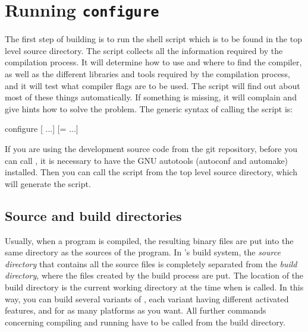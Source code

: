 \section{Running \texttt{configure}}
\label{sec:configure}


The first step of building \es is to run the shell script
 which is to be found in the top level source
directory.  The script collects all the information required by the
compilation process.  It will determine how to use and where to find
the compiler, as well as the different libraries and tools required by
the compilation process, and it will test what compiler flags are to
be used.  The script will find out about most of these things
automatically.  If something is missing, it will complain and give
hints how to solve the problem.  The generic syntax of calling the
 script is:
\begin{code}
configure [ ...] [= ...]
\end{code}

If you are using the development source code from the \textsf{git}
repository, before you can call , it is necessary
to have the GNU autotools (\textsf{autoconf} and \textsf{automake})
installed. Then you can call the script  from
the top level source directory, which will generate the
 script.

\subsection{Source and build directories}
\label{ssec:builddir}
 

Usually, when a program is compiled, the resulting binary files are
put into the same directory as the sources of the program.  In \es's
build system, the \emph{source directory} that contains all the source
files is completely separated from the \emph{build directory}, where
the files created by the build process are put.  The location of the
build directory is the current working directory at the time when
 is called.  In this way, you can build several
variants of \es, each variant having different activated features, and
for as many platforms as you want.  All further commands concerning
compiling and running \es have to be called from the build directory.

